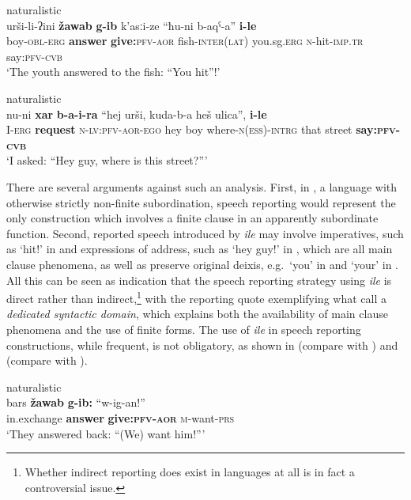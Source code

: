 \documentclass[output=paper,colorlinks,citecolor=brown]{langscibook}
\begin{document}
\ea \label{ex:DD51} \textnormal{naturalistic} \\
\gll urši-li-ʔini \textbf{žawab} \textbf{g-ib} k'asːi-ze ``ħu-ni b-aqˁ-a'' \textbf{i-le} \\
boy-\textsc{obl-erg} \textbf{answer} \textbf{give:}\textsc{pfv-aor} fish-\textsc{inter(lat)} you.sg.\textsc{erg} \textsc{n}-hit-\textsc{imp.tr} say:\textsc{pfv-cvb} \\
\glt `The youth answered to the fish: ``You hit''!'
\z

\ea \label{ex:DD52} \textnormal{naturalistic} \\
\gll nu-ni \textbf{xar} \textbf{b-a-i-ra} ``hej urši, kuda-b-a heš ulica'', \textbf{i-le} \\
I-\textsc{erg} \textbf{request} \textsc{n-lv:pfv-aor-ego} hey boy where-\textsc{n(ess)-intrg} that street \textbf{say:\textsc{pfv-cvb}} \\
\glt `I asked: ``Hey guy, where is this street?'''
\z

 There are several arguments against such an analysis. First, in , a language with otherwise strictly non-finite subordination, speech reporting would represent the only construction which involves a finite clause in an apparently subordinate function. Second, reported speech introduced by \textit{ile} may involve imperatives, such as `hit!' in  and expressions of address, such as `hey guy!' in , which are all main clause phenomena, as well as preserve original deixis, e.g.\  `you' in  and `your' in . All this can be seen as indication that the speech reporting strategy using \textit{ile} is direct rather than indirect,\footnote{Whether indirect reporting does exist in  languages at all is in fact a controversial issue.} with the reporting quote exemplifying what \citet{SpronckNikitina2019} call a \textit{dedicated syntactic domain}, which explains both the availability of main clause phenomena and the use of finite forms. The use of \textit{ile} in speech reporting constructions, while frequent, is not obligatory, as shown in  (compare with ) and  (compare with ).

\ea \label{ex:DD53} \textnormal{naturalistic} \\
\gll bars \textbf{žawab} \textbf{g-ib:} ``w-ig-an!'' \\
in.exchange \textbf{answer} \textbf{give:\textsc{pfv-aor}} \textsc{m}-want-\textsc{prs} \\
\glt `They answered back: ``(We) want him!''{}'
\z
\end{document}
